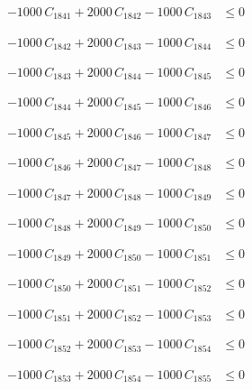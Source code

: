 \documentclass[a4paper,11pt]{article}
\begin{document}
\begin{align}
-1000\,C_{1841} + 2000\,C_{1842} - 1000\,C_{1843} &\leq 0 \nonumber
\end{align}

\begin{align}
-1000\,C_{1842} + 2000\,C_{1843} - 1000\,C_{1844} &\leq 0 \nonumber
\end{align}

\begin{align}
-1000\,C_{1843} + 2000\,C_{1844} - 1000\,C_{1845} &\leq 0 \nonumber
\end{align}

\begin{align}
-1000\,C_{1844} + 2000\,C_{1845} - 1000\,C_{1846} &\leq 0 \nonumber
\end{align}

\begin{align}
-1000\,C_{1845} + 2000\,C_{1846} - 1000\,C_{1847} &\leq 0 \nonumber
\end{align}

\begin{align}
-1000\,C_{1846} + 2000\,C_{1847} - 1000\,C_{1848} &\leq 0 \nonumber
\end{align}

\begin{align}
-1000\,C_{1847} + 2000\,C_{1848} - 1000\,C_{1849} &\leq 0 \nonumber
\end{align}

\begin{align}
-1000\,C_{1848} + 2000\,C_{1849} - 1000\,C_{1850} &\leq 0 \nonumber
\end{align}

\begin{align}
-1000\,C_{1849} + 2000\,C_{1850} - 1000\,C_{1851} &\leq 0 \nonumber
\end{align}

\begin{align}
-1000\,C_{1850} + 2000\,C_{1851} - 1000\,C_{1852} &\leq 0 \nonumber
\end{align}

\begin{align}
-1000\,C_{1851} + 2000\,C_{1852} - 1000\,C_{1853} &\leq 0 \nonumber
\end{align}

\begin{align}
-1000\,C_{1852} + 2000\,C_{1853} - 1000\,C_{1854} &\leq 0 \nonumber
\end{align}

\begin{align}
-1000\,C_{1853} + 2000\,C_{1854} - 1000\,C_{1855} &\leq 0 \nonumber
\end{align}
\end{document}
